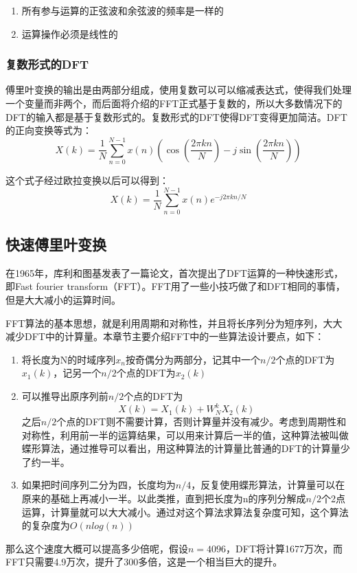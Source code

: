 \begin{enumerate}
\item 所有参与运算的正弦波和余弦波的频率是一样的
\item 运算操作必须是线性的
\end{enumerate}

\subsubsection{复数形式的DFT}
傅里叶变换的输出是由两部分组成，使用复数可以可以缩减表达式，使得我们处理一个变量而非两个，而后面将介绍的FFT正式基于复数的，所以大多数情况下的DFT的输入都是基于复数形式的。复数形式的DFT使得DFT变得更加简洁。DFT的正向变换等式为：$$X(k)=\frac{1}{N}\sum_{n=0}^{N-1}x(n)(\cos(\frac{2\pi kn}{N}) - j\sin(\frac{2\pi kn}{N}))$$

这个式子经过欧拉变换以后可以得到：$$X(k)=\frac{1}{N}\sum_{n=0}^{N-1}x(n)e^{-j2\pi kn/N}$$

\subsection{快速傅里叶变换}
\label{sec:FFT}

在1965年，库利和图基发表了一篇论文，首次提出了DFT运算的一种快速形式，即Fast fourier transform（FFT）。FFT用了一些小技巧做了和DFT相同的事情，但是大大减小的运算时间。

FFT算法的基本思想，就是利用周期和对称性，并且将长序列分为短序列，大大减少DFT中的计算量。本章节主要介绍FFT中的一些算法设计要点，如下：

\begin{enumerate}
\item 将长度为N的时域序列$x_n$按奇偶分为两部分，记其中一个$n/2$个点的DFT为$x_1(k)$，记另一个$n/2$个点的DFT为$x_2(k)$
\item 可以推导出原序列前$n/2$个点的DFT为$$X(k)=X_1(k)+W^k_NX_2(k)$$之后$n/2$个点的DFT则不需要计算，否则计算量并没有减少。考虑到周期性和对称性，利用前一半的运算结果，可以用来计算后一半的值，这种算法被叫做蝶形算法，通过推导可以看出，用这种算法的计算量比普通的DFT的计算量少了约一半。
\item 如果把时间序列二分为四，长度均为$n/4$，反复使用蝶形算法，计算量可以在原来的基础上再减小一半。以此类推，直到把长度为n的序列分解成$n/2$个2点运算，计算量就可以大大减小。通过对这个算法求算法复杂度可知，这个算法的复杂度为$O(nlog(n))$
\end{enumerate}

那么这个速度大概可以提高多少倍呢，假设$n=4096$，DFT将计算1677万次，而FFT只需要4.9万次，提升了300多倍，这是一个相当巨大的提升。

